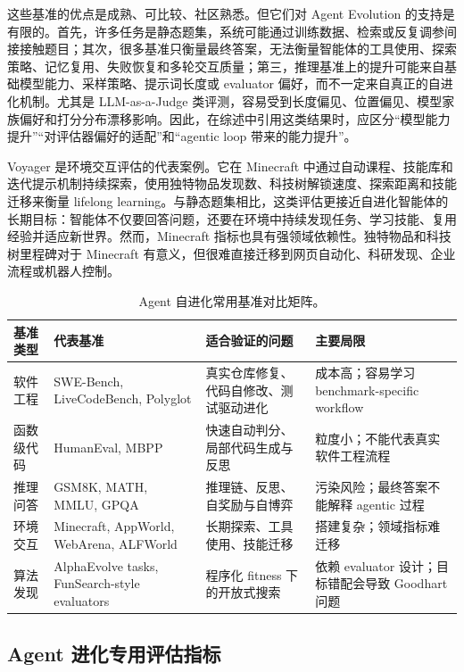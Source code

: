 这些基准的优点是成熟、可比较、社区熟悉。但它们对 Agent Evolution 的支持是有限的。首先，许多任务是静态题集，系统可能通过训练数据、检索或反复调参间接接触题目；其次，很多基准只衡量最终答案，无法衡量智能体的工具使用、探索策略、记忆复用、失败恢复和多轮交互质量；第三，推理基准上的提升可能来自基础模型能力、采样策略、提示词长度或 evaluator 偏好，而不一定来自真正的自进化机制。尤其是 LLM-as-a-Judge 类评测，容易受到长度偏见、位置偏见、模型家族偏好和打分分布漂移影响。因此，在综述中引用这类结果时，应区分“模型能力提升”“对评估器偏好的适配”和“agentic loop 带来的能力提升”。

Voyager 是环境交互评估的代表案例。它在 Minecraft 中通过自动课程、技能库和迭代提示机制持续探索，使用独特物品发现数、科技树解锁速度、探索距离和技能迁移来衡量 lifelong learning。与静态题集相比，这类评估更接近自进化智能体的长期目标：智能体不仅要回答问题，还要在环境中持续发现任务、学习技能、复用经验并适应新世界。然而，Minecraft 指标也具有强领域依赖性。独特物品和科技树里程碑对于 Minecraft 有意义，但很难直接迁移到网页自动化、科研发现、企业流程或机器人控制。

\begin{table}[htbp]
\centering
\small
\caption{Agent 自进化常用基准对比矩阵。}
\label{tab:benchmarks}
\begin{tabular}{p{2.5cm}p{2.4cm}p{3.6cm}p{3.7cm}}
\toprule
\textbf{基准类型} & \textbf{代表基准} & \textbf{适合验证的问题} & \textbf{主要局限} \\
\midrule
软件工程 & SWE-Bench, LiveCodeBench, Polyglot & 真实仓库修复、代码自修改、测试驱动进化 & 成本高；容易学习 benchmark-specific workflow \\
函数级代码 & HumanEval, MBPP & 快速自动判分、局部代码生成与反思 & 粒度小；不能代表真实软件工程流程 \\
推理问答 & GSM8K, MATH, MMLU, GPQA & 推理链、反思、自奖励与自博弈 & 污染风险；最终答案不能解释 agentic 过程 \\
环境交互 & Minecraft, AppWorld, WebArena, ALFWorld & 长期探索、工具使用、技能迁移 & 搭建复杂；领域指标难迁移 \\
算法发现 & AlphaEvolve tasks, FunSearch-style evaluators & 程序化 fitness 下的开放式搜索 & 依赖 evaluator 设计；目标错配会导致 Goodhart 问题 \\
\bottomrule
\end{tabular}
\end{table}

\subsection{Agent 进化专用评估指标}

